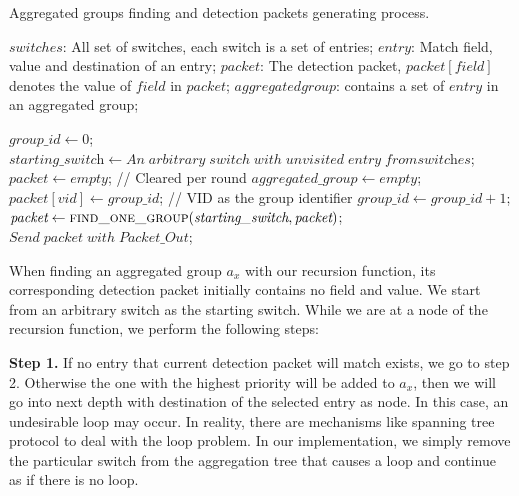 \documentclass[conference]{IEEEtran}
\begin{document}
\label{pseudo}
\begin{algorithm}[ht]

  \caption{Aggregated groups finding and detection packets generating process.}
  \begin{algorithmic}[1]
    \Require
      $switches$: All set of switches, each switch is a set of entries;  \newline
      $entry$: Match field, value and destination of an entry;  \newline
      $packet$: The detection packet, $packet[field]$ denotes the value of $field$ in $packet$; \newline
      $aggregated group$: contains a set of $entry$ in an aggregated group; \newline
      
      \State $\textit{group\_id} \gets 0$;
            \State $\textit{starting\_switch} \gets An\;arbitrary\;switch\;with\;unvisited\;entry\;from\textit{switches}$;
            \State $\textit{packet} \gets empty$;   // Cleared per round
            \State $\textit{aggregated\_group} \gets empty$;
            \State $packet[vid] \gets \textit{group\_id}$;   // VID as the group identifier 
            \State $group\_id \gets \textit{group\_id} + 1$;
            \State $\textit{packet} \gets \Call{find\_one\_group}{\textit{starting\_switch}, 
            \textit{packet}}$;
            \State $Send\;\textit{packet}\;with\;Packet\_Out$;
      \EndWhile
    \EndFunction
  \end{algorithmic}
\end{algorithm}

When finding an aggregated group $a_x$ with our recursion function, its corresponding detection packet initially contains no field and value. We start from an arbitrary switch as the starting switch. While we are at a node of the recursion function, we perform the following steps:

\textbf{Step 1.} If no entry that current detection packet will match exists, we go to step 2. Otherwise the one with the highest priority will be added to $a_x$, then we will go into next depth with destination of the selected entry as node. In this case, an undesirable loop may occur. In reality, there are mechanisms like spanning tree protocol to deal with the loop problem. In our implementation, we simply remove the particular switch from the aggregation tree that causes a loop and continue as if there is no loop.
\end{document}
